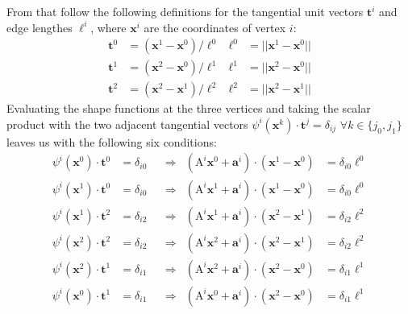 \documentclass{scrartcl}
\begin{document}
From that follow the following definitions for the tangential unit vectors
$\mathbf t^i$ and edge lengthes $\ell^i$, where $\mathbf x^i$ are the
coordinates of vertex $i$:
\begin{subequations}
  \begin{align}
    \mathbf t^0&=(\mathbf x^1-\mathbf x^0)/\ell^0 &
         \ell^0&=||\mathbf x^1-\mathbf x^0||      \\
    \mathbf t^1&=(\mathbf x^2-\mathbf x^0)/\ell^1 &
         \ell^1&=||\mathbf x^2-\mathbf x^0||      \\
    \mathbf t^2&=(\mathbf x^2-\mathbf x^1)/\ell^2 &
         \ell^2&=||\mathbf x^2-\mathbf x^1||
  \end{align}
\end{subequations}
Evaluating the shape functions at the three vertices and taking the scalar
product with the two adjacent tangential vectors $\psi^i(\mathbf
x^k)\cdot\mathbf t^j=\delta_{ij}$ $\forall k\in\{j_0,j_1\}$ leaves us with
the following six conditions:
\begin{subequations}
  \begin{align}
    \label{cond:x0t0}
    \psi^i(\mathbf x^0)\cdot\mathbf t^0&=\delta_{i0} &&\Longrightarrow &
        (\mathrm A^i\mathbf x^0+\mathbf a^i)
        \cdot(\mathbf x^1-\mathbf x^0)&=\delta_{i0}\ell^0              \\
    \label{cond:x1t0}
    \psi^i(\mathbf x^1)\cdot\mathbf t^0&=\delta_{i0} &&\Longrightarrow &
        (\mathrm A^i\mathbf x^1+\mathbf a^i)
        \cdot(\mathbf x^1-\mathbf x^0)&=\delta_{i0}\ell^0              \\
    \label{cond:x1t2}
    \psi^i(\mathbf x^1)\cdot\mathbf t^2&=\delta_{i2} &&\Longrightarrow &
        (\mathrm A^i\mathbf x^1+\mathbf a^i)
        \cdot(\mathbf x^2-\mathbf x^1)&=\delta_{i2}\ell^2              \\
    \label{cond:x2t2}
    \psi^i(\mathbf x^2)\cdot\mathbf t^2&=\delta_{i2} &&\Longrightarrow &
        (\mathrm A^i\mathbf x^2+\mathbf a^i)
        \cdot(\mathbf x^2-\mathbf x^1)&=\delta_{i2}\ell^2              \\
    \label{cond:x2t1}
    \psi^i(\mathbf x^2)\cdot\mathbf t^1&=\delta_{i1} &&\Longrightarrow &
        (\mathrm A^i\mathbf x^2+\mathbf a^i)
        \cdot(\mathbf x^2-\mathbf x^0)&=\delta_{i1}\ell^1              \\
    \label{cond:x0t1}
    \psi^i(\mathbf x^0)\cdot\mathbf t^1&=\delta_{i1} &&\Longrightarrow &
        (\mathrm A^i\mathbf x^0+\mathbf a^i)
        \cdot(\mathbf x^2-\mathbf x^0)&=\delta_{i1}\ell^1
  \end{align}
\end{subequations}
\end{document}
